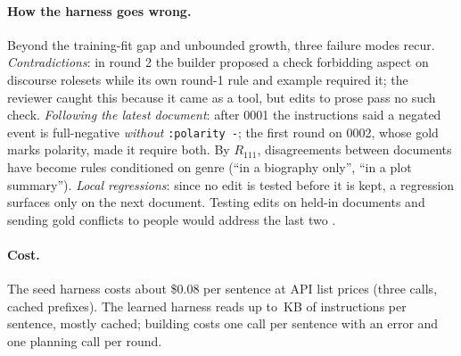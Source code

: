 \paragraph{How the harness goes wrong.}
Beyond the training-fit gap and unbounded growth, three failure modes recur. \emph{Contradictions}: in round 2 the builder proposed a check forbidding aspect on discourse rolesets while its own round-1 rule and example required it; the reviewer caught this because it came as a tool, but edits to prose pass no such check. \emph{Following the latest document}: after 0001 the instructions said a negated event is full-negative \emph{without} \texttt{:polarity -}; the first round on 0002, whose gold marks polarity, made it require both. By $R_{111}$, disagreements between documents have become rules conditioned on genre (``in a biography only'', ``in a plot summary''). \emph{Local regressions}: since no edit is tested before it is kept, a regression surfaces only on the next document. Testing edits on held-in documents \citep{zhang2026self,wang2026do} and sending gold conflicts to people would address the last two .

\paragraph{Cost.}
The seed harness costs about \$0.08 per sentence at API list prices (three calls, cached prefixes). The learned harness reads up to \sizeLast{}\,KB of instructions per sentence, mostly cached; building costs one call per sentence with an error and one planning call per round. 
